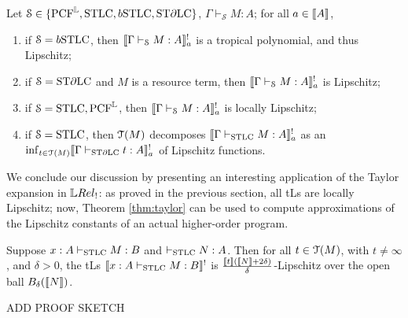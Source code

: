 \begin{theorem}
Let $\mathcal S\in \{\RM{PCF}^{\Lawv}, \STLC,\BSTLC,\STDLC\}$, $\Gamma\vdash_{\mathcal S}M:A$; for all $a\in \llbracket A\rrbracket$,
\begin{enumerate}
\item if $\mathcal S=\BSTLC$, then $\llbracket\Gamma\vdash_{\mathcal S}M:A\rrbracket^{!}_{a}$ is a tropical polynomial, and thus Lipschitz;

\item if $\mathcal S=\mathrm{ST}\partial\mathrm{LC}$ and $M$ is a resource term, then $\llbracket\Gamma\vdash_{\mathcal S}M:A\rrbracket^{!}_{a}$ is Lipschitz;

\item if $\mathcal S=\mathrm{STLC},\mathrm{PCF}^{\mathbb{L}}$, then $\llbracket\Gamma\vdash_{\mathcal S}M:A\rrbracket^{!}_{a}$ is locally Lipschitz;

\item if $\mathcal S=\mathrm{STLC}$, then $\mathcal{T}(M)$ decomposes $\llbracket\Gamma \vdash_{\mathrm{STLC}} M:A\rrbracket^!_{a}$ as an $\inf_{t\in\mathcal{T}(M)}\llbracket\Gamma\vdash_{\mathrm{ST}\partial\mathrm{LC}} t:A\rrbracket^!_{a}$ of {Lipschitz} functions.
\end{enumerate}

\end{theorem}




%
%
%


We conclude our discussion by presenting an interesting application of the Taylor expansion in $\LREL_{!}$: as proved in the previous section, all tLs are locally Lipschitz; now, Theorem \ref{thm:taylor} can be used to compute approximations of the Lipschitz constants of an actual higher-order program.

\begin{corollary}
Suppose $x: A \vdash_{\mathrm{STLC}}M:B$ and $\vdash_{\mathrm{STLC}} N:A$. 
Then for all $t\in \mathcal{T}(M)$, with $t\neq \infty$, and $\delta>0$, the tLs $\llbracket x:A\vdash_{\mathrm{STLC}}M:B\rrbracket^{!}$ is $\frac{\llbracket t\rrbracket(\llbracket N\rrbracket+2\delta)}{\delta}$-Lipschitz over the open ball
 $B_{\delta}(\llbracket N\rrbracket)$.
\end{corollary}
{\color{red}ADD PROOF SKETCH}

